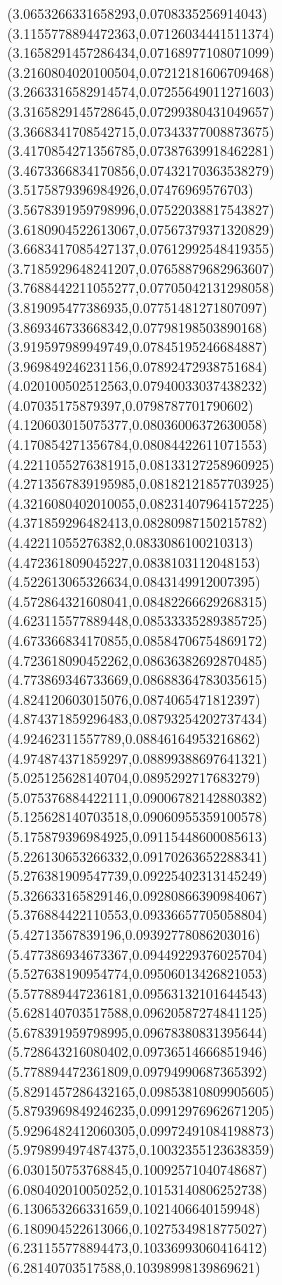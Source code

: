 {(3.0653266331658293,0.0708335256914043)
(3.1155778894472363,0.07126034441511374)
(3.1658291457286434,0.07168977108071099)
(3.2160804020100504,0.07212181606709468)
(3.2663316582914574,0.07255649011271603)
(3.3165829145728645,0.07299380431049657)
(3.3668341708542715,0.07343377008873675)
(3.4170854271356785,0.07387639918462281)
(3.4673366834170856,0.07432170363538279)
(3.5175879396984926,0.07476969576703)
(3.5678391959798996,0.07522038817543827)
(3.6180904522613067,0.07567379371320829)
(3.6683417085427137,0.07612992548419355)
(3.7185929648241207,0.07658879682963607)
(3.7688442211055277,0.07705042131298058)
(3.819095477386935,0.07751481271807097)
(3.869346733668342,0.07798198503890168)
(3.919597989949749,0.07845195246684887)
(3.969849246231156,0.07892472938751684)
(4.020100502512563,0.07940033037438232)
(4.07035175879397,0.0798787701790602)
(4.120603015075377,0.08036006372630058)
(4.170854271356784,0.08084422611071553)
(4.2211055276381915,0.08133127258960925)
(4.2713567839195985,0.08182121857703925)
(4.3216080402010055,0.08231407964157225)
(4.371859296482413,0.08280987150215782)
(4.42211055276382,0.0833086100210313)
(4.472361809045227,0.0838103112048153)
(4.522613065326634,0.0843149912007395)
(4.572864321608041,0.08482266629268315)
(4.623115577889448,0.08533335289385725)
(4.673366834170855,0.08584706754869172)
(4.723618090452262,0.08636382692870485)
(4.773869346733669,0.08688364783035615)
(4.824120603015076,0.0874065471812397)
(4.874371859296483,0.08793254202737434)
(4.92462311557789,0.08846164953216862)
(4.974874371859297,0.08899388697641321)
(5.025125628140704,0.0895292717683279)
(5.075376884422111,0.09006782142880382)
(5.125628140703518,0.09060955359100578)
(5.175879396984925,0.09115448600085613)
(5.226130653266332,0.09170263652288341)
(5.276381909547739,0.09225402313145249)
(5.326633165829146,0.09280866390984067)
(5.376884422110553,0.09336657705058804)
(5.42713567839196,0.09392778086203016)
(5.477386934673367,0.09449229376025704)
(5.527638190954774,0.09506013426821053)
(5.577889447236181,0.09563132101644543)
(5.628140703517588,0.09620587274841125)
(5.678391959798995,0.09678380831395644)
(5.728643216080402,0.09736514666851946)
(5.778894472361809,0.09794990687365392)
(5.8291457286432165,0.09853810809905605)
(5.8793969849246235,0.09912976962671205)
(5.9296482412060305,0.09972491084198873)
(5.9798994974874375,0.10032355123638359)
(6.030150753768845,0.10092571040748687)
(6.080402010050252,0.10153140806252738)
(6.130653266331659,0.1021406640159948)
(6.180904522613066,0.10275349818775027)
(6.231155778894473,0.10336993060416412)
(6.28140703517588,0.10398998139869621)
}

